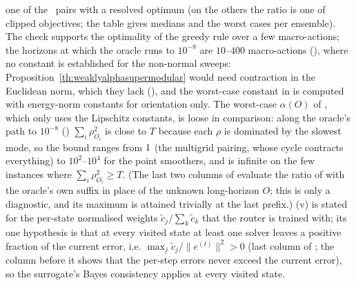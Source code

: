 one of the \caThmResolved\ pairs with a resolved optimum (on the others the ratio is one of clipped objectives; the table gives medians and the worst cases per ensemble). The check supports the optimality of the greedy rule over a few macro-actions; the horizons at which the oracle runs to $10^{-8}$ are $10$--$400$ macro-actions (), where no constant is established for the non-normal sweeps: Proposition~\ref{th:weaklyalphasupermodular} would need contraction in the Euclidean norm, which they lack (), and the worst-case constant in  is computed with energy-norm constants for orientation only. The worst-case $\alpha(O)$ of , which only uses the Lipschitz constants, is loose in comparison: along the oracle's path to $10^{-8}$ () $\sum_i \rho_{O_i}^2$ is close to $T$ because each $\rho$ is dominated by the slowest mode, so the bound ranges from $1$ (the multigrid pairing, whose cycle contracts everything) to $10^2$--$10^4$ for the point smoothers, and is infinite on the few instances where $\sum_i \rho_{O_i}^2 \ge T$. (The last two columns of  evaluate the ratio of  with the oracle's own suffix in place of the unknown long-horizon $O$; this is only a diagnostic, and its maximum is attained trivially at the last prefix.) (v)  is stated for the per-state normalised weights $\tilde c_j/\sum_k \tilde c_k$ that the router is trained with; its one hypothesis is that at every visited state at least one solver leaves a positive fraction of the current error, i.e. $\max_j \tilde c_j / \|e^{(t)}\|^2 > 0$ (last column of ; the column before it shows that the per-step errors never exceed the current error), so the surrogate's Bayes consistency applies at every visited state.

\begin{table}[H]
\color{red}
\centering
\caption{Numerical check of the assumptions of Propositions~\ref{th:weaklyalphasupermodular}--\ref{th:simultaneoussupermodular} for every operation of the study (mean-free subspace). \textbf{[Provisional: development run; the confirmatory run regenerates this table with the compiled kernels' macro-action sizes.]} $\|\cdot\|_2$: Euclidean Lipschitz constant of the error propagation map (power-iteration estimate; exact from the symbol for Jacobi); $\|\cdot\|_A$: Lipschitz constant in the energy norm of the symmetric part of $\mathcal{L}_h$, for one iteration and for the macro-action of $m_j$ iterations; $\rho$: spectral radius; $\sigma_{\min}$: smallest observed contraction (a unit error at the first grid point for the triangular sweeps, the minimum over Fourier modes otherwise; for the corrector, the largest remaining fraction of a band mode); $\|C_j(0)\|$: zero preservation; last column: commutator with the corrector's map on random unit vectors (Proposition~\ref{th:simultaneoussupermodular}). For (damped) Jacobi the constants are exact from the Fourier symbol (the value with the Nyquist modes included; without them undamped Jacobi has $\|G\|_2 = \rho = 0.9994$ at $128^2$).}
\resizebox{\textwidth}{!}{\caassump}
\label{tab:ca_assump}
\end{table}

